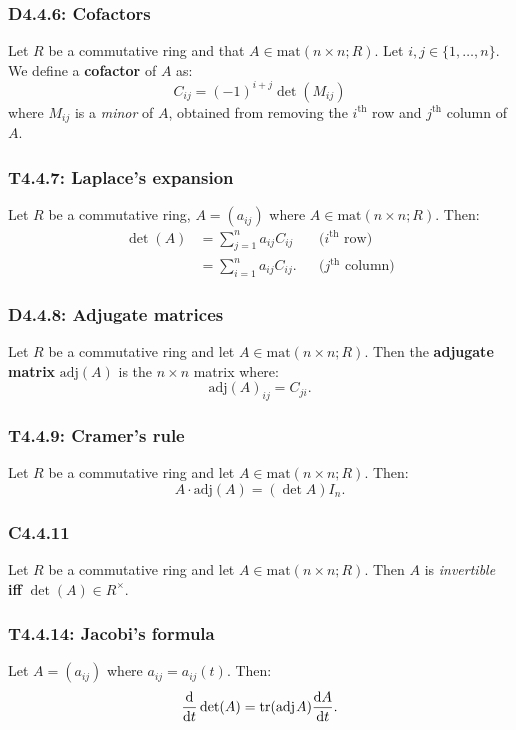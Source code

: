 \documentclass{article}
\begin{document}
\begin{multicols*}{3}
\subsubsection*{D4.4.6: Cofactors}
Let $R$ be a commutative ring and that $A\in\text{mat}(n\times n; R)$.
Let $i,j\in\{1,\dots,n\}$. We define a \textbf{cofactor} of $A$ as:
$$C_{ij}=(-1)^{i+j}\det(M_{ij})$$
where $M_{ij}$ is a \textit{minor} of $A$, obtained from removing the 
$i^{\text{th}}$ row and $j^{\text{th}}$ column of $A$.

\subsubsection*{T4.4.7: Laplace's expansion}
Let $R$ be a commutative ring, $A=(a_{ij})$ where
$A\in\text{mat}(n\times n; R)$. Then:
\begin{align*}
    \det(A)
    &=\sum_{j=1}^{n}a_{ij}C_{ij} 
    &&\text{($i^{\text{th}}$ row)} \\
    &=\sum_{i=1}^{n}a_{ij}C_{ij}.
    &&\text{($j^{\text{th}}$ column)}
\end{align*}

\subsubsection*{D4.4.8: Adjugate matrices}
Let $R$ be a commutative ring and let $A\in\text{mat}(n\times n;R)$.
Then the \textbf{adjugate matrix} $\text{adj}(A)$ is the $n\times n$
matrix where:
$$\text{adj}(A)_{ij}=C_{ji}.$$

\subsubsection*{T4.4.9: Cramer's rule}
Let $R$ be a commutative ring and let $A\in\text{mat}(n\times n;R)$.
Then:
$$A\cdot\text{adj}(A)=(\det A)I_n.$$

\subsubsection*{C4.4.11}
Let $R$ be a commutative ring and let $A\in\text{mat}(n\times n;R)$.
Then $A$ is \textit{invertible} \textbf{if{}f} $\det(A)\in R^{\times}$.

\subsubsection*{T4.4.14: Jacobi's formula}
Let $A=(a_{ij})$ where $a_{ij}=a_{ij}(t)$. Then:
$$\dv{t}\det(A)=\tr(\text{adj}\hspace{0.01in}A)\dv{A}{t}.$$


\end{multicols*}
\end{document}

